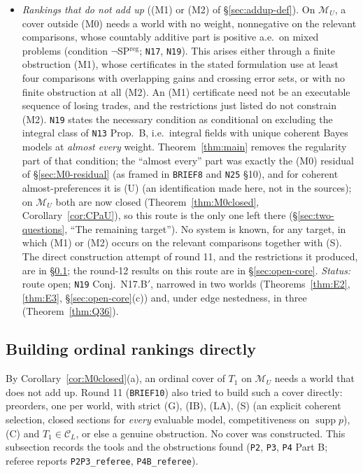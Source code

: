 \documentclass[11pt]{article}
\theoremstyle{definition}
\theoremstyle{remark}
\newcommand{\M}{\mathcal M}
\newcommand{\C}{\mathcal C}
\newcommand{\supp}{\operatorname{supp}}
\newcommand{\src}[1]{\texttt{#1}}
\begin{document}
\begin{itemize}[leftmargin=*]
\item \emph{Rankings that do not add up} ((M1) or (M2) of \S\ref{sec:addup-def}). On $\M_U$, a cover outside (M0) needs a world with no weight, nonnegative on the relevant comparisons, whose countably additive part is positive a.e.\ on mixed problems (condition $\neg$SP$^{\mathrm{reg}}$; \src{N17}, \src{N19}). This arises either through a finite obstruction (M1), whose certificates in the stated formulation use at least four comparisons with overlapping gains and crossing error sets, or with no finite obstruction at all (M2). An (M1) certificate need not be an executable sequence of losing trades, and the restrictions just listed do not constrain (M2). \src{N19} states the necessary condition as conditional on excluding the integral class of \src{N13} Prop.~B, i.e.\ integral fields with unique coherent Bayes models at \emph{almost every} weight. Theorem~\ref{thm:main} removes the regularity part of that condition; the ``almost every'' part was exactly the (M0) residual of \S\ref{sec:M0-residual} (as framed in \src{BRIEF8} and \src{N25} \S10), and for coherent almost-preferences it is (U) (an identification made here, not in the sources); on $\M_U$ both are now closed (Theorem~\ref{thm:M0closed}, Corollary~\ref{cor:CPaU}), so this route is the only one left there (\S\ref{sec:two-questions}, ``The remaining target''). No system is known, for any target, in which (M1) or (M2) occurs on the relevant comparisons together with (S). The direct construction attempt of round 11, and the restrictions it produced, are in \S\ref{sec:open-ordinal}; the round-12 results on this route are in \S\ref{sec:open-core}. \emph{Status:} route open; \src{N19} Conj.~N17.B$'$, narrowed in two worlds (Theorems~\ref{thm:E2}, \ref{thm:E3}, \S\ref{sec:open-core}(c)) and, under edge nestedness, in three (Theorem~\ref{thm:Q36}).
\end{itemize}

\subsection{Building ordinal rankings directly}\label{sec:open-ordinal}
By Corollary~\ref{cor:M0closed}(a), an ordinal cover of $T_1$ on $\M_U$ needs a world that does not add up. Round 11 (\src{BRIEF10}) also tried to build such a cover directly: preorders, one per world, with strict (G), (IB), (LA), (S) (an explicit coherent selection, closed sections for \emph{every} evaluable model, competitiveness on $\supp p$), (C) and $T_1\in\C_L$, or else a genuine obstruction. No cover was constructed. This subsection records the tools and the obstructions found (\src{P2}, \src{P3}, \src{P4} Part B; referee reports \src{P2P3\_referee}, \src{P4B\_referee}).
\end{document}
